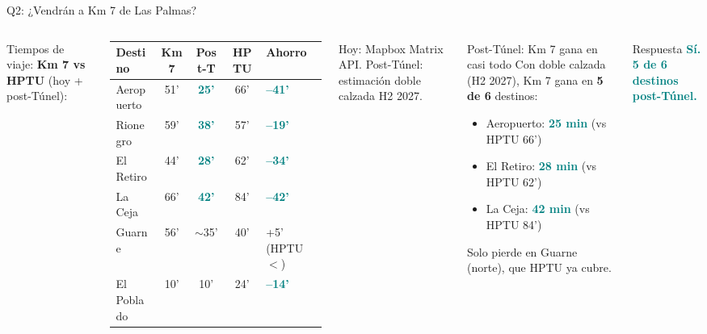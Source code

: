\documentclass[aspectratio=169, 11pt]{beamer}
\newcommand{\highlight}[1]{\textcolor{teal}{\textbf{#1}}}
\newcommand{\src}[1]{\par\vspace{2pt}{\tiny\textcolor{slate}{Fuente: #1}}}
\begin{document}
\begin{frame}{Q2: ¿Vendrán a Km 7 de Las Palmas?}
\begin{columns}[T]
{\scriptsize Tiempos de viaje: \textbf{Km 7 vs HPTU} (hoy + post-Túnel):}

\vspace{2pt}
{\tiny
\begin{tabular}{@{}lcccl@{}}
\toprule
\textbf{Destino} & \textbf{Km 7} & \textbf{Post-T} & \textbf{HPTU} & \textbf{Ahorro} \\
\midrule
\rowcolor{teal!10}
Aeropuerto & 51' & \highlight{25'} & 66' & \highlight{--41'} \\
\rowcolor{teal!10}
Rionegro & 59' & \highlight{38'} & 57' & \highlight{--19'} \\
\rowcolor{teal!10}
El Retiro & 44' & \highlight{28'} & 62' & \highlight{--34'} \\
\rowcolor{teal!10}
La Ceja & 66' & \highlight{42'} & 84' & \highlight{--42'} \\
Guarne & 56' & $\sim$35' & 40' & +5' (HPTU $<$) \\
El Poblado & 10' & 10' & 24' & \highlight{--14'} \\
\bottomrule
\end{tabular}
}

\vspace{1pt}
{\tiny Hoy: Mapbox Matrix API. Post-Túnel: estimación doble calzada H2 2027.}
\src{Mapbox Matrix API, ANI/INVIAS}

\begin{exampleblock}{\small Post-Túnel: Km 7 gana en casi todo}
\scriptsize
Con doble calzada (H2 2027), Km 7 gana en \textbf{5 de 6} destinos:
\begin{itemize}\setlength{\itemsep}{0pt}
  \item Aeropuerto: \highlight{25 min} (vs HPTU 66')
  \item El Retiro: \highlight{28 min} (vs HPTU 62')
  \item La Ceja: \highlight{42 min} (vs HPTU 84')
\end{itemize}
\vspace{1pt}
Solo pierde en Guarne (norte), que HPTU ya cubre.
\end{exampleblock}

\vspace{2pt}
\begin{exampleblock}{\small Respuesta}
\centering\large
\highlight{Sí. 5 de 6 destinos post-Túnel.}
\end{exampleblock}
\end{columns}
\end{frame}
\end{document}
